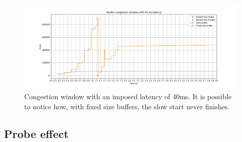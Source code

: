 \documentclass[a4paper,10pt]{article}
\begin{document}
\begin{figure}[h]
\centering
\includegraphics[width=\textwidth]{images/40_cwnd_comparison.png}
\caption{Congestion window with an imposed latency of 40ms. It is possible to notice how, with fixed size buffers, the slow start never finishes.}
\label{fig:40_cwnd}
\end{figure}

\subsection{Probe effect}
\end{document}
